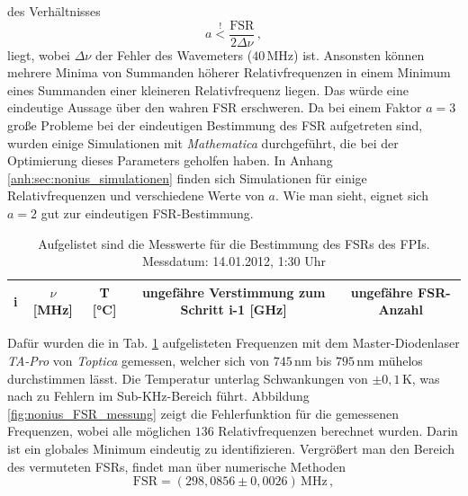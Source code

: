 des Verhältnisses
\begin{equation}\label{eq:nonius_faktor}
	a\stackrel{!}{<}\frac{\text{FSR}}{2\Delta\nu}\,,
\end{equation}
liegt, wobei $\Delta\nu$ der Fehler des Wavemeters ($40\,$MHz) ist. Ansonsten
können mehrere Minima von Summanden höherer Relativfrequenzen in einem Minimum
eines Summanden einer kleineren Relativfrequenz liegen. Das würde eine
eindeutige Aussage über den wahren FSR erschweren. Da bei
einem Faktor $a=3$ große Probleme bei der eindeutigen Bestimmung des FSR
aufgetreten sind, wurden einige Simulationen mit \textit{Mathematica}
durchgeführt, die bei der Optimierung dieses Parameters geholfen haben.
In Anhang \ref{anh:sec:nonius_simulationen} finden sich Simulationen für einige
Relativfrequenzen und verschiedene Werte von $a$. Wie man sieht, eignet sich
$a=2$ gut zur eindeutigen FSR-Bestimmung.\par
\begin{table}[h]
	\begin{tabular}{ccccc}
		\toprule
		\multicolumn{1}{C{0.05\textwidth}}{i} &
		\multicolumn{1}{C{0.15\textwidth}}{$\nu$ [MHz]} &
		\multicolumn{1}{C{0.10\textwidth}}{T [°C]} &
		\multicolumn{1}{C{0.25\textwidth}}{ungefähre Verstimmung zum
		Schritt i-1 [GHz]} &
		\multicolumn{1}{C{0.23\textwidth}}{ungefähre FSR-Anzahl}\\
		\midrule[1px]
		\hline
		
		\bottomrule[1px]
	\end{tabular}
	\caption[FSR Messung]{Aufgelistet sind die Messwerte für die Bestimmung des
	FSRs des FPIs. Messdatum: 14.01.2012, 1:30 Uhr}
	\label{tab:nonius_FSR_messung}
\end{table}
Dafür wurden die in Tab. \ref{tab:nonius_FSR_messung} aufgelisteten Frequenzen
mit dem Master-Diodenlaser \textit{TA-Pro} von \textit{Toptica} gemessen,
welcher sich von $745\,$nm bis $795\,$nm mühelos durchstimmen lässt.
Die Temperatur unterlag Schwankungen von $\pm0,1\,$K, was nach
\cite{kuschnick:2000:diplomarbeit} zu Fehlern im Sub-KHz-Bereich führt.
Abbildung \ref{fig:nonius_FSR_messung} zeigt die Fehlerfunktion für die
gemessenen Frequenzen, wobei alle möglichen $136$ Relativfrequenzen berechnet
wurden. Darin ist ein globales Minimum eindeutig zu identifizieren.
Vergrößert man den Bereich des vermuteten FSRs, findet man über numerische
Methoden
\begin{equation}\label{eq:FSR_messung}
	\text{FSR}=(298,0856\pm0,0026)\,\text{MHz}\,,
\end{equation}
